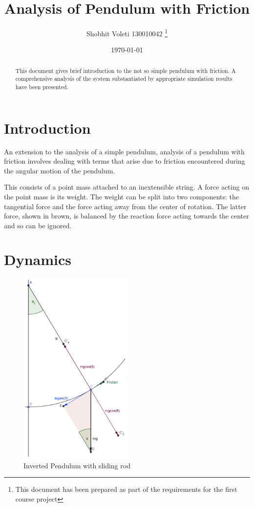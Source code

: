 \documentclass[11pt]{article}
\title{Analysis of Pendulum with Friction}
\author{Shobhit Voleti 130010042 \thanks{This document has been prepared as part of the requirements for the first course project}}
\date{\today}
\begin{document}
\maketitle
\begin{abstract}
\newline This document gives brief introduction to the not so simple pendulum with friction. A comprehensive analysis of the system substantiated by appropriate simulation results have been presented.
\end{abstract}
\section{Introduction \cite{google}}
An extension to the analysis of a simple pendulum, analysis of a pendulum with friction involves dealing with terms that arise due to friction encountered during the angular motion of the pendulum.

This consists of a point mass attached to an inextensible string. A force acting on the point mass is its weight. The weight can be split into two components: the tangential force and the force acting away from the center of rotation. The latter force, shown in brown, is balanced by the reaction force acting towards the center and so can be ignored.


\newpage
\section{Dynamics \cite{nrich}}

\begin{figure}[H]
\centering
\includegraphics[width = 0.5\textwidth]{fric_pen.png}
\caption{Inverted Pendulum with sliding rod}
\label{Fig1}
\end{figure}
\end{document}
